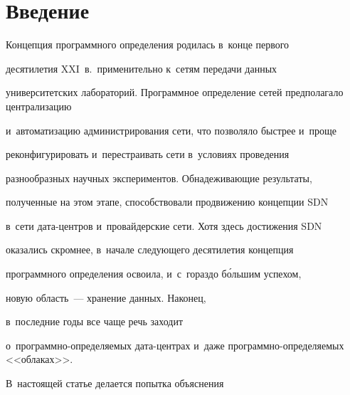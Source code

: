









 \thispagestyle{headings}


 


 \vspace*{-6pt}





\section{Введение}





\vspace*{-4pt}





    Концепция программного определения родилась в~конце первого 


десятилетия XXI~в.\ применительно к~сетям передачи данных 


университетских лабораторий. Программное определение сетей предполагало централизацию 


и~автоматизацию администрирования сети, что поз\-во\-ля\-ло быст\-рее и~проще 


реконфигурировать и~перестраивать сети в~условиях проведения 


разнообразных научных экспериментов. Об\-на\-де\-жи\-ва\-ющие результаты, 


полученные на этом этапе, способствовали про\-дви\-же\-нию концепции SDN 


в~сети да\-та-цент\-ров и~провайдерские сети. Хотя здесь достижения SDN 


оказались скром\-нее, в~начале сле\-ду\-юще\-го десятилетия концепция 


программного определения освоила, и~с~гораздо б\'{о}льшим успехом, 


новую область~--- хранение данных. Наконец, 


в~последние годы все чаще речь заходит  


о~про\-грам\-мно-опре\-де\-ля\-емых дата-центрах и~даже про\-грам\-мно-опре\-де\-ля\-емых <<облаках>>. 


В~настоящей статье делается попытка объяснения 


